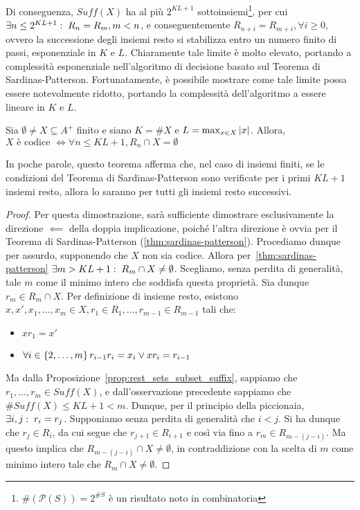 Di conseguenza, \(Suff(X)\) ha al più \(2^{KL+1}\) sottoinsiemi\footnote{\(\#(\mathcal{P}(S)) = 2^{\#S}\) è un risultato noto in combinatoria}, per cui \(\exists n \leq 2^{KL+1} :\; R_n = R_m, m < n\), e conseguentemente \(R_{n+i} = R_{m+i}, \forall i \geq 0\), ovvero la successione degli insiemi resto si stabilizza entro un numero finito di passi, esponenziale in \(K\) e \(L\).
Chiaramente tale limite è molto elevato, portando a complessità esponenziale nell'algoritmo di decisione basato sul Teorema di Sardinas-Patterson.
Fortunatamente, è possibile mostrare come tale limite possa essere notevolmente ridotto, portando la complessità dell'algoritmo a essere lineare in \(K\) e \(L\).
\begin{theorem}[Levanshtein???]
  Sia \(\emptyset \neq X \subseteq A^+\) finito e siano \(K = \# X\) e \(L = \max_{x \in X} \left|x\right|\).
  Allora, \(X \text{ è codice } \iff \forall n \leq KL +1, R_n \cap X = \emptyset\)
\end{theorem}

In poche parole, questo teorema afferma che, nel caso di insiemi finiti, se le condizioni del Teorema di Sardinas-Patterson sono verificate per i primi \(KL+1\) insiemi resto, allora lo saranno per tutti gli insiemi resto successivi.

\begin{proof}
  Per questa dimostrazione, sarà sufficiente dimostrare esclusivamente la direzione \(\impliedby\) della doppia implicazione, poiché l'altra direzione è ovvia per il Teorema di Sardinas-Patterson (\ref{thm:sardinas-patterson}).
  Procediamo dunque per assurdo, supponendo che \(X\) non sia codice. Allora per~\ref{thm:sardinas-patterson} \(\exists m > KL + 1 :\; R_m \cap X \neq \emptyset\).
  Scegliamo, senza perdita di generalità, tale \(m\) come il minimo intero che soddisfa questa proprietà.
  Sia dunque \(r_m \in R_m \cap X\). Per definizione di insieme resto, esistono \(x,x',x_1,\ldots,x_m \in X, r_1\in R_1,\ldots,r_{m-1} \in R_{m-1}\) tali che:
  \begin{itemize}
    \item \(xr_1=x'\) 
    \item \(\forall i \in \set{2,\ldots,m} r_{i-1}r_i=x_i \lor xr_i = r_{i-1}\)
  \end{itemize}
  Ma dalla Proposizione~\ref{prop:rest_sets_subset_suffix}, sappiamo che \(r_1,\ldots,r_m \in Suff(X)\), e dall'osservazione precedente sappiamo che \(\# Suff(X) \leq KL + 1 < m\).
  Dunque, per il principio della piccionaia, \(\exists i,j :\; r_i=r_j\). Supponiamo senza perdita di generalità che \(i<j\).
  Si ha dunque che \(r_j \in R_i\), da cui segue che \(r_{j+1} \in R_{i+1}\) e così via fino a \(r_m \in R_{m-(j-i)}\).
  Ma questo implica che \(R_{m-(j-i)} \cap X \neq \emptyset\), in contraddizione con la scelta di \(m\) come minimo intero tale che \(R_m \cap X \neq \emptyset\).
\end{proof}

